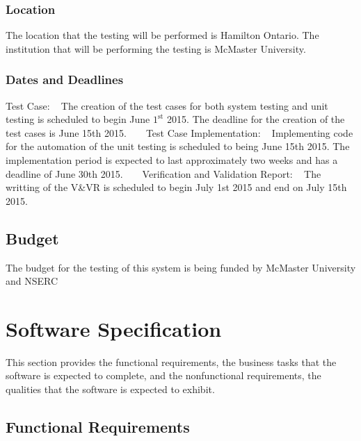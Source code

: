 \documentclass[12pt]{article}
\begin{document}
\subsubsection{Location}
The location that the testing will be performed is Hamilton Ontario. The institution that
will be performing the testing is McMaster University. 


\subsubsection{Dates and Deadlines}
Test Case:
~\newline
The creation of the test cases for both system testing and unit testing is scheduled to begin June $1^\text{st}$ 2015.
The deadline for the creation of the test cases is June 15th 2015. 
~\newline
~\newline
Test Case Implementation:
~\newline
Implementing code for the automation of the unit testing is scheduled to being June 15th 2015. The implementation period
is expected to last approximately two weeks and has a deadline of June 30th 2015.
~\newline
~\newline
Verification and Validation Report:
~\newline
The writting of the V\&VR is scheduled to begin July 1st 2015 and end on July 15th 2015. 

\subsection{Budget}
The budget for the testing of this system is being funded by McMaster University and NSERC

%
%

\section{ Software Specification}
This section provides the functional requirements, the business tasks that the
software is expected to complete, and the nonfunctional requirements, the
qualities that the software is expected to exhibit.

\subsection{Functional Requirements}
\end{document}
